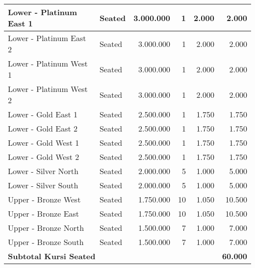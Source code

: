\begin{longtable}{|l|l|r|r|r|r|}
    Lower - Platinum East 1                                         & Seated          & 3.000.000      & 1             & 2.000               & 2.000          \\
    \hline
    Lower - Platinum East 2                                         & Seated          & 3.000.000      & 1             & 2.000               & 2.000          \\
    \hline
    Lower - Platinum West 1                                         & Seated          & 3.000.000      & 1             & 2.000               & 2.000          \\
    \hline
    Lower - Platinum West 2                                         & Seated          & 3.000.000      & 1             & 2.000               & 2.000          \\
    \hline
    Lower - Gold East 1                                             & Seated          & 2.500.000      & 1             & 1.750               & 1.750          \\
    \hline
    Lower - Gold East 2                                             & Seated          & 2.500.000      & 1             & 1.750               & 1.750          \\
    \hline
    Lower - Gold West 1                                             & Seated          & 2.500.000      & 1             & 1.750               & 1.750          \\
    \hline
    Lower - Gold West 2                                             & Seated          & 2.500.000      & 1             & 1.750               & 1.750          \\
    \hline
    Lower - Silver North                                            & Seated          & 2.000.000      & 5             & 1.000               & 5.000          \\
    \hline
    Lower - Silver South                                            & Seated          & 2.000.000      & 5             & 1.000               & 5.000          \\
    \hline
    Upper - Bronze West                                             & Seated          & 1.750.000      & 10            & 1.050               & 10.500         \\
    \hline
    Upper - Bronze East                                             & Seated          & 1.750.000      & 10            & 1.050               & 10.500         \\
    \hline
    Upper - Bronze North                                            & Seated          & 1.500.000      & 7             & 1.000               & 7.000          \\
    \hline
    Upper - Bronze South                                            & Seated          & 1.500.000      & 7             & 1.000               & 7.000          \\
    \hline
    \multicolumn{5}{|l|}{\textbf{Subtotal Kursi Seated}}            & \textbf{60.000}                                                                         \\
    \hline \hline


\end{longtable}
